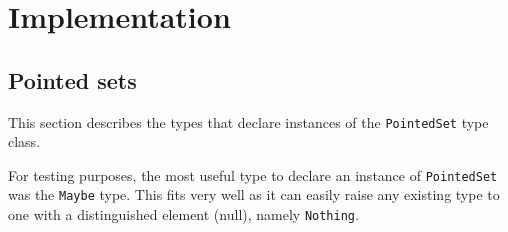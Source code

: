 \section{Implementation}
\subsection{Pointed sets}
This section describes the types that declare instances of the
\texttt{PointedSet} type class.

For testing purposes, the most useful type to declare an instance of
\texttt{PointedSet} was the \texttt{Maybe} type. This fits very well as it can
easily raise any existing type to one with a distinguished element (null),
namely \texttt{Nothing}.
